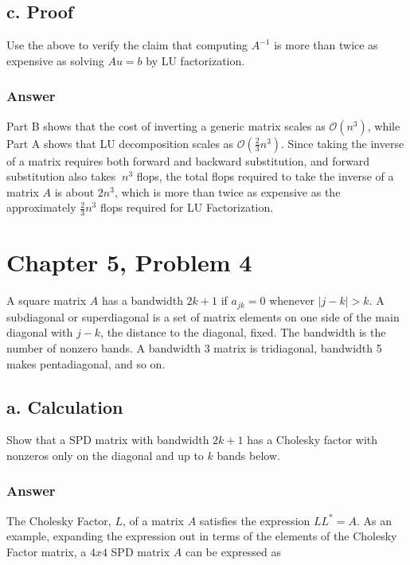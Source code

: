 \documentclass{article}
\begin{document}
		
		\subsection{c. Proof}
		Use the above to verify the claim that computing $A^{-1}$ is more than twice as expensive as solving $Au=b$ by LU factorization.
	
		\subsubsection{Answer}
		Part B shows that the cost of inverting a generic matrix scales as $\mathcal{O}(n^3)$, while Part A shows that LU decomposition scales as $\mathcal{O}(\frac{2}{3}n^3)$.  Since taking the inverse of a matrix requires both forward and backward substitution, and forward substitution also takes $~n^{3}$ flops, the total flops required to take the inverse of a matrix $A$ is about $2n^{3}$, which is more than twice as expensive as the approximately $\frac{2}{3}n^{3}$ flops required for LU Factorization.
		
	\section{Chapter 5, Problem 4}
	A square matrix $A$ has a bandwidth $2k+1$ if $a_{jk}=0$ whenever $|j-k|>k$.  A subdiagonal or superdiagonal is a set of matrix elements on one side of the main diagonal with $j-k$, the distance to the diagonal, fixed.  The bandwidth is the number of nonzero bands.  A bandwidth 3 matrix is tridiagonal, bandwidth 5 makes pentadiagonal, and so on.
	
		\subsection{a. Calculation}
		Show that a SPD matrix with bandwidth $2k+1$ has a Cholesky factor with nonzeros only on the diagonal and up to $k$ bands below.
		
		\subsubsection{Answer}
		The Cholesky Factor, $L$, of a matrix $A$ satisfies the expression $LL^{*}=A$.  As an example, expanding the expression out in terms of the elements of the Cholesky Factor matrix, a $4x4$ SPD matrix $A$ can be expressed as 
		
\end{document}

